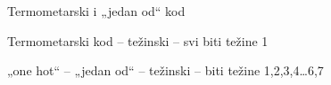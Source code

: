 \begin{frame}[label=06-s016]{Termometarski i „jedan od“ kod}

\fontsize{10}{12}\selectfont
\begin{center}{\fontsize{9}{10}\selectfont}\end{center}
\smallskip
Termometarski kod – težinski – svi biti težine 1\par
„one hot“ – „jedan od“ – težinski – biti težine 1,2,3,4…6,7
\end{frame}
